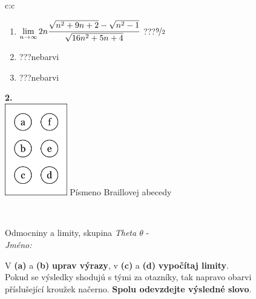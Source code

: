 \documentclass[10pt]{report}
\begin{document}
\begin{tabular}{c:c}
\begin{minipage}[c][104.5mm][t]{0.5\linewidth}
\begin{center}
\begin{minipage}{0.79\linewidth}
\begin{center}
\begin{varwidth}{\linewidth}
\begin{enumerate}
\item $\lim\limits_{n\to\infty}2n\cfrac{\sqrt{n^2+9n+2}-\sqrt{n^2-1}}{\sqrt{16n^2+5n+4}}$\quad \dotfill\; ???\;\dotfill \quad $\nicefrac{9}{2}$
\item \quad \dotfill\; ???\;\dotfill \quad nebarvi
\item \quad \dotfill\; ???\;\dotfill \quad nebarvi
\end{enumerate}
\end{varwidth}
\end{center}
\end{minipage}
\begin{minipage}{0.20\linewidth}
\begin{center}
{\Huge\bfseries 2.} \\[2mm]
\includegraphics[height=40mm]{../images/braille.png}
{\small Písmeno Braillovej abecedy}
\end{center}
\end{minipage}
\end{center}
\end{minipage}
\\ \hdashline
\begin{minipage}[c][104.5mm][t]{0.5\linewidth}
\begin{center}
\vspace{7mm}
{\huge Odmocniny a limity, skupina \textit{Theta $\theta$} -}\\[5mm]
\textit{Jméno:}\phantom{xxxxxxxxxxxxxxxxxxxxxxxxxxxxxxxxxxxxxxxxxxxxxxxxxxxxxxxxxxxxxxxxx}\\[5mm]
\begin{minipage}{0.95\linewidth}
\begin{center}
V \textbf{(a)} a \textbf{(b)} \textbf{uprav výrazy}, v \textbf{(c)} a \textbf{(d)} \textbf{vypočítaj limity}.\\Pokud se výsledky shodujú s tými za otazníky, tak napravo obarvi\\příslušející kroužek načerno. \textbf{Spolu odevzdejte výsledné slovo}.
\end{center}
\end{minipage}
\\[1mm]

\end{center}
\end{minipage}
\end{tabular}
\end{document}
